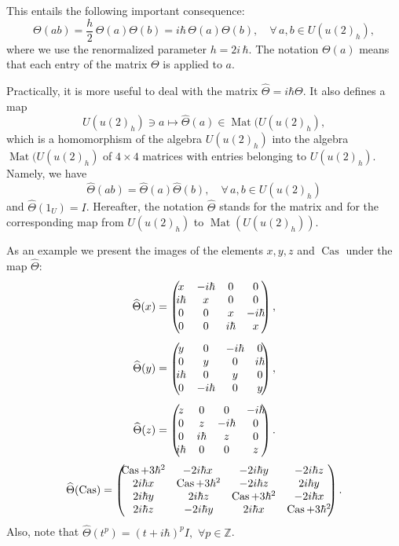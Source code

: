 \documentclass[10pt,a4paper]{amsart}
\DeclareMathOperator{\Cas}{Cas}
\newcommand{\hh}{\hbar}
\newcommand{\hatt}{\widehat{\Theta}}
\DeclareMathOperator{\Mat}{Mat}
\numberwithin{equation}{section}
\begin{document}
This entails the following important consequence:
\[
{\Theta}(ab)=\frac{h}{2} \,{\Theta}(a){\Theta}(b)=i\hh\, {\Theta}(a){\Theta}(b),\quad \forall\, a,b \in U(u(2)_h),
\]
where we use  the renormalized parameter $h = 2i\,\hh$. The notation ${\Theta}(a)$ means that each entry of the
matrix $\Theta$ is applied to $a$.

Practically, it is more useful to deal with the matrix  $\hatt=i\hh \Theta$. It also defines a map
\[
U(u(2)_h) \ni a \mapsto \hatt(a)\in {\Mat}(U(u(2)_h),
\]
which is a homomorphism of the algebra $U(u(2)_h)$ into the algebra ${\Mat}(U(u(2)_h)$ of $4\times 4$ matrices
with entries belonging to $U(u(2)_h)$. Namely, we have
\begin{equation}
{\hatt}(ab)={\hatt}(a){\hatt}(b),\quad \forall \,a,b \in U(u(2)_h)
\label{The}
\end{equation}
and $\hatt(1_U)=I$. Hereafter, the notation $\hatt$ stands  for the matrix and for the corresponding map
from $U(u(2)_h)$ to ${\Mat}(U(u(2)_h))$.

As an example we present the images of the elements $x,y,z$ and $\Cas$ under the map $\hatt$:
\begin{align}
{\hatt}(x)&=
\left(\!\!\begin{array}{@{}cccc@{}}
 x&-i\hh&0&0\\
 i\hh&x&0&0\\
 0&0&x&-i\hh\\
 0&0&i\hh&x
\end{array}\!\!\right), \notag\\[1ex]
{\hatt}(y)&=
\left(\!\!\begin{array}{@{}cccc@{}}
 y&0&-i\hh&0\\
 0&y&0&i\hh\\
 i\hh&0&y&0\\
 0&-i\hh&0&y
\end{array}\!\!\right), \notag\\[1ex]
{\hatt}(z)&=
\left(\!\!\begin{array}{@{}cccc@{}}
 z&0&0&-i\hh\\
 0&z&-i\hh&0\\
 0&i\hh&z&0\\
 i\hh&0&0&z
\end{array}\!\!\right).
\end{align}
\begin{equation}
{\hatt}(\Cas)=
\left(\!\!
\begin{array}{@{}cccc@{}}
	\Cas+3\hh^2 &   \displaystyle -2i\hh x\,& \displaystyle -2i\hh y &\displaystyle -2i\hh z\\
	\displaystyle  2i\hh x&\Cas+3\hh^2&\displaystyle -2i\hh z &\displaystyle 2i\hh y \\
	\displaystyle 2i\hh y &\displaystyle 2i\hh z &\Cas+3\hh^2 &\displaystyle -2i\hh x\\
	\displaystyle 2i\hh z &\displaystyle -2i\hh y & \displaystyle 2i\hh x&\Cas+3\hh^2
\end{array}
\!\!\right).
\end{equation}
Also, note that  $\hatt(t^p)=(t+i\hh)^p I,\,\, \forall p\in \mathbb{Z }$.
\end{document}
